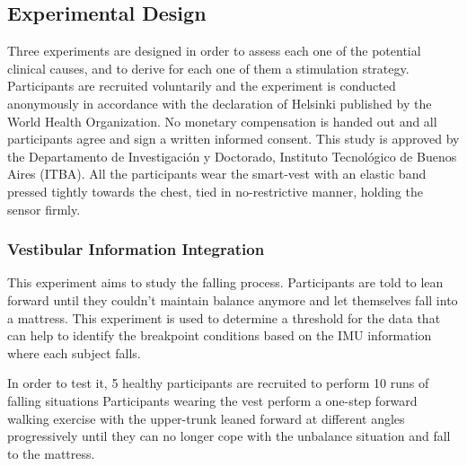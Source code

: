 \documentclass[conference]{IEEEtran}
\begin{document}

\subsection{Experimental Design}
\label{sec:experimental}

Three experiments are designed in order to assess each one of the potential clinical causes, and to derive for each one of them a stimulation strategy.  Participants are recruited voluntarily and the experiment is conducted anonymously in accordance with the declaration of Helsinki published by the World Health Organization. No monetary compensation is handed out and all participants agree and sign a written informed consent. This study is approved by the Departamento de Investigación y Doctorado, Instituto Tecnológico de Buenos Aires (ITBA).  All the participants wear the smart-vest with an elastic band pressed tightly towards the chest, tied in no-restrictive manner, holding the sensor firmly. 


\subsubsection{Vestibular Information Integration}

This experiment aims to study the falling process. Participants are told to lean forward until they couldn't maintain balance anymore and let themselves fall into a mattress. This experiment is used to determine a threshold for the data that can help to identify the breakpoint conditions based on the IMU information where each subject falls.

In order to test it, 5 healthy participants are recruited to perform 10 runs of falling situations  Participants wearing the vest  perform a one-step forward walking exercise with the upper-trunk leaned forward at different angles progressively until they can no longer cope with the unbalance situation and fall to the mattress.
\end{document}
